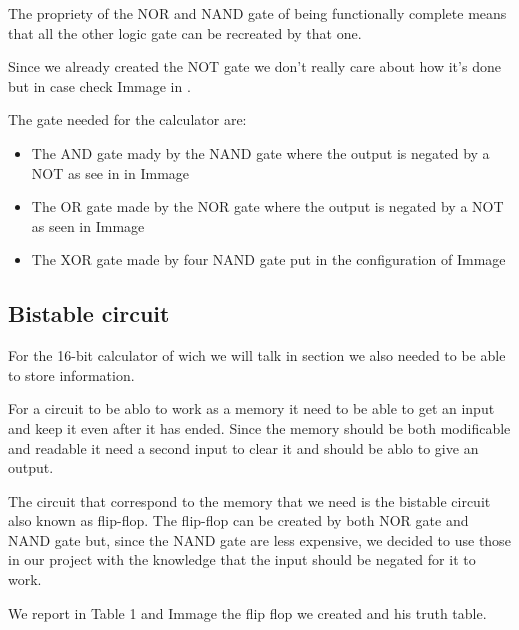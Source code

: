 \documentclass{article}
\begin{document}
The propriety of the NOR and NAND gate of being functionally complete means that all the other logic gate can be recreated by that one. 

Since we already created the NOT gate we don't really care about how it's done but in case check Immage %
in %
. 

The gate needed for the calculator are: 

\begin{itemize}
\item The AND gate mady by the NAND gate where the output is negated by a NOT as see in in Immage %
\item The OR gate made by the NOR gate where the output is negated by a NOT as seen in Immage %
\item The XOR gate made by four NAND gate put in the configuration of Immage %
\end{itemize}


\subsection{Bistable circuit}

For the 16-bit calculator of wich we will talk in section %
we also needed to be able to store information. 

For a circuit to be ablo to work as a memory it need to be able to get an input and keep it even after it has ended. Since the memory should be both modificable and readable it need a second input to clear it and should be ablo to give an output.

\vspace{3mm}

The circuit that correspond to the memory that we need is the bistable circuit also known as flip-flop.
The flip-flop can be created by both NOR gate and NAND gate but, since the NAND gate are less expensive, we decided to use those in our project with the knowledge that the input should be negated for it to work.

We report in Table 1 and Immage %
the flip flop we created and his truth table.

\end{document}
